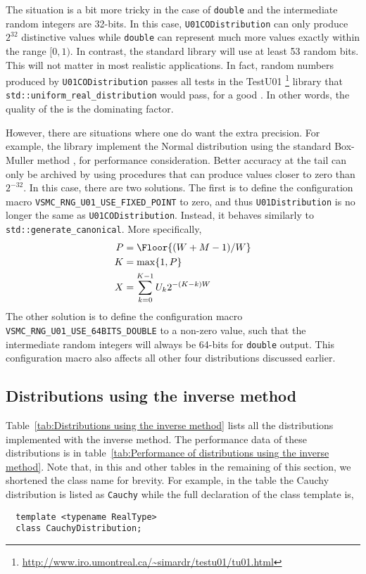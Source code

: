 The situation is a bit more tricky in the case of \verb|double| and the
intermediate random integers are 32-bits. In this case,
\verb|U01CODistribution| can only produce $2^{32}$ distinctive values while
\verb|double| can represent much more values exactly within the range $[0, 1)$.
In contrast, the standard library will use at least 53 random bits. This will
not matter in most realistic applications. In fact, random numbers produced by
\verb|U01CODistribution| passes all tests in the
{\lnfigures\tbfigures TestU01}%
\footnote{\url{http://www.iro.umontreal.ca/~simardr/testu01/tu01.html}}
library that \verb|std::uniform_real_distribution| would pass, for a good \rng.
In other words, the quality of the \rng is the dominating factor.

However, there are situations where one do want the extra precision. For
example, the library implement the Normal distribution using the standard
Box-Muller method \parencite{Box:1958hv}, for performance consideration. Better
accuracy at the tail can only be archived by using procedures that can produce
values closer to zero than $2^{-32}$. In this case, there are two solutions.
The first is to define the configuration macro
\verb|VSMC_RNG_U01_USE_FIXED_POINT| to zero, and thus \verb|U01Distribution| is
no longer the same as \verb|U01CODistribution|. Instead, it behaves similarly
to \verb|std::generate_canonical|. More specifically,
\begin{align*}
  P &= \Floor{(W + M - 1) / W} \\
  K &= \max\{1, P\} \\
  X &= \sum_{k=0}^{K - 1} U_k 2^{-(K - k)W}
\end{align*}
The other solution is to define the configuration macro
\verb|VSMC_RNG_U01_USE_64BITS_DOUBLE| to a non-zero value, such that the
intermediate random integers will always be 64-bits for \verb|double| output.
This configuration macro also affects all other four distributions discussed
earlier.

\subsection{Distributions using the inverse method}
\label{sub:Distributions using the inverse method}

Table~\ref{tab:Distributions using the inverse method} lists all the
distributions implemented with the inverse method. The performance data of
these distributions is in table~\ref{tab:Performance of distributions using the
  inverse method}. Note that, in this and other tables in the remaining of this
section, we shortened the class name for brevity. For example, in the table the
Cauchy distribution is listed as \verb|Cauchy| while the full declaration of
the class template is,
\begin{Verbatim}
  template <typename RealType>
  class CauchyDistribution;
\end{Verbatim}

